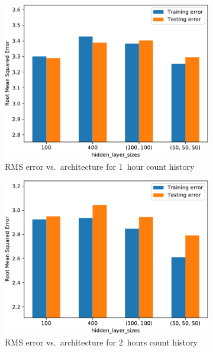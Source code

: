 \clearpage
\begin{figure}[!ht]\centering
    \begin{subfigure}[t]{.47\linewidth}\centering
        \includegraphics[width=0.9\linewidth]{./figures/AplotA1.pdf}
        \caption{RMS error vs.~architecture for 1~hour count history}\label{AppAplotA1}
    \end{subfigure}\hfill%
    \begin{subfigure}[t]{.47\linewidth}\centering
        \includegraphics[width=0.9\linewidth]{./figures/AplotA2.pdf}
        \caption{RMS error vs.~architecture for 2~hours count history}\label{AppAplotA2}
    \end{subfigure}\\[5pt]
    \begin{subfigure}[t]{.47\linewidth}\centering

\end{subfigure}
\end{figure}
